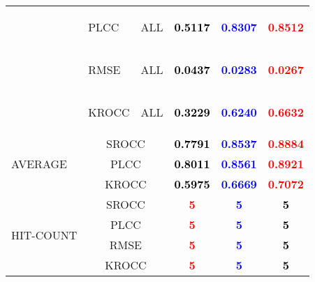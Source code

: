 \documentclass{article}
\begin{document}
\begin{table}
\begin{tabular}{||l|l|l||ccc||}
\cmidrule{2-6}\cmidrule{2-6}
&\multirow{1}{*}{\begin{turn}{-90}PLCC\end{turn}}&ALL&\textbf{\textcolor{black}{0.5117}}&\textbf{\textcolor{blue}{0.8307}}&\textbf{\textcolor{red}{0.8512}}\\
\cmidrule{2-6}\cmidrule{2-6}
&\multirow{1}{*}{\begin{turn}{-90}RMSE\end{turn}}&ALL&\textbf{\textcolor{black}{0.0437}}&\textbf{\textcolor{blue}{0.0283}}&\textbf{\textcolor{red}{0.0267}}\\
\cmidrule{2-6}\cmidrule{2-6}
&\multirow{1}{*}{\begin{turn}{-90}KROCC\end{turn}}&ALL&\textbf{\textcolor{black}{0.3229}}&\textbf{\textcolor{blue}{0.6240}}&\textbf{\textcolor{red}{0.6632}}\\
\midrule\midrule
\multirow{3}{*}{\begin{turn}{-90}AVERAGE\end{turn}}&\multicolumn{2}{c||}{SROCC}&\textbf{\textcolor{black}{0.7791}}&\textbf{\textcolor{blue}{0.8537}}&\textbf{\textcolor{red}{0.8884}}
\\ \cmidrule{2-6}
&\multicolumn{2}{c||}{PLCC}&\textbf{\textcolor{black}{0.8011}}&\textbf{\textcolor{blue}{0.8561}}&\textbf{\textcolor{red}{0.8921}}
\\ \cmidrule{2-6}
&\multicolumn{2}{c||}{KROCC}&\textbf{\textcolor{black}{0.5975}}&\textbf{\textcolor{blue}{0.6669}}&\textbf{\textcolor{red}{0.7072}}
\\ \midrule \midrule
\multirow{4}{*}{\begin{turn}{-90}HIT-COUNT\end{turn}}&\multicolumn{2}{c||}{SROCC}&\textbf{\textcolor{red}{5}}&\textbf{\textcolor{blue}{5}}&\textbf{\textcolor{black}{5}}
\\ \cmidrule{2-6}
&\multicolumn{2}{c||}{PLCC}&\textbf{\textcolor{red}{5}}&\textbf{\textcolor{blue}{5}}&\textbf{\textcolor{black}{5}}
\\ \cmidrule{2-6}
&\multicolumn{2}{c||}{RMSE}&\textbf{\textcolor{red}{5}}&\textbf{\textcolor{blue}{5}}&\textbf{\textcolor{black}{5}}
\\ \cmidrule{2-6}
&\multicolumn{2}{c||}{KROCC}&\textbf{\textcolor{red}{5}}&\textbf{\textcolor{blue}{5}}&\textbf{\textcolor{black}{5}}
\\ \midrule \midrule
\end{tabular}
\end{table}
\end{document}
